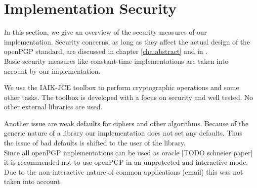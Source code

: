 %
%
%
%
%
%

\newpage

\section{Implementation Security}
In this section, we give an overview of the security measures of our implementation. 
Security concerns, as long as they affect the actual design of the openPGP standard, are discussed in chapter \ref{cha:abstract} and in .  \\

Basic security measures like constant-time implementations are taken into account by our implementation. 

We use the IAIK-JCE toolbox to perform cryptographic operations and some other tasks. The toolbox is developed with a focus on security and well tested. No other external libraries are used. 

Another issue are weak defaults for ciphers and other algorithms. Because of the generic nature of a library our implementation does not set any defaults. Thus the issue of bad defaults is shifted to the user of the library. \\

Since all openPGP implementations can be used as oracle [TODO schneier paper] it is recommended not to use openPGP in an unprotected and interactive mode. Due to the non-interactive nature of common applications (email) this was not taken into account.






